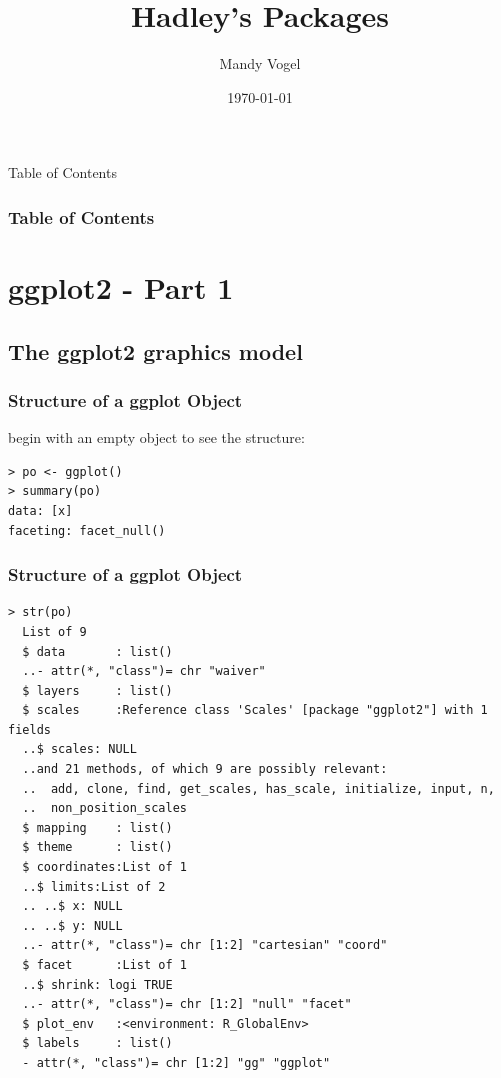 \documentclass[xcolor={table},c]{beamer}
\begin{document}
\title{Hadley's Packages}   
\author{Mandy Vogel} 
\date{\today}


\begin{frame}
\titlepage
\end{frame}

\begin{frame}[allowframebreaks,t]{Table of Contents}
\frametitle{Table of Contents}\tableofcontents
\end{frame}



\section{ggplot2 - Part 1}
\subsection{The ggplot2 graphics model}

\begin{frame}[fragile]\frametitle{Structure of a ggplot Object}
begin with an empty object to see the structure:
\begin{verbatim}
> po <- ggplot()
> summary(po)
data: [x]
faceting: facet_null() 
\end{verbatim}
\end{frame} 

\begin{frame}[fragile]\frametitle{Structure of a ggplot Object}
\scriptsize
\begin{verbatim}
> str(po)
  List of 9
  $ data       : list()
  ..- attr(*, "class")= chr "waiver"
  $ layers     : list()
  $ scales     :Reference class 'Scales' [package "ggplot2"] with 1 fields
  ..$ scales: NULL
  ..and 21 methods, of which 9 are possibly relevant:
  ..  add, clone, find, get_scales, has_scale, initialize, input, n,
  ..  non_position_scales
  $ mapping    : list()
  $ theme      : list()
  $ coordinates:List of 1
  ..$ limits:List of 2
  .. ..$ x: NULL
  .. ..$ y: NULL
  ..- attr(*, "class")= chr [1:2] "cartesian" "coord"
  $ facet      :List of 1
  ..$ shrink: logi TRUE
  ..- attr(*, "class")= chr [1:2] "null" "facet"
  $ plot_env   :<environment: R_GlobalEnv> 
  $ labels     : list()
  - attr(*, "class")= chr [1:2] "gg" "ggplot"
\end{verbatim}
\end{frame}
\end{document}
